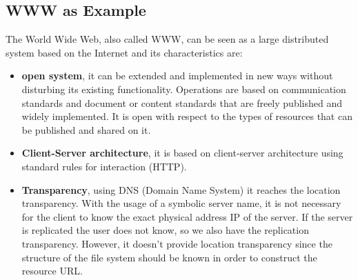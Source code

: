 \subsection{WWW as Example}
The World Wide Web, also called WWW, can be seen as a large distributed system based on the Internet and its characteristics are:
\begin{itemize}
    \item \textbf{open system}, it can be extended and implemented in new ways without disturbing its existing functionality. Operations are based on communication standards and document or content standards that are freely published and widely implemented. It is open with respect to the types of resources that can be published and shared on it.
    \item \textbf{Client-Server architecture}, it is based on client-server architecture using standard rules for interaction (HTTP).
    \item \textbf{Transparency}, using DNS (Domain Name System) it reaches the location transparency. With the usage of a symbolic server name, it is not necessary for the client to know the exact physical address IP of the server. If the server is replicated the user does not know, so we also have the replication transparency. However, it doesn't provide location transparency since the structure of the file system should be known in order to construct the resource URL.
\end{itemize}
